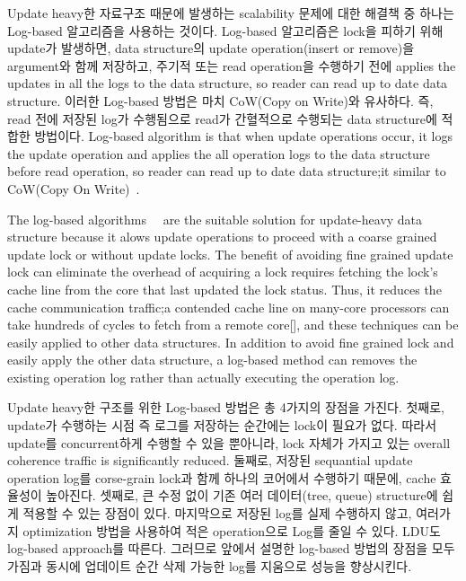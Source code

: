 \ifkor
Update heavy한 자료구조 때문에 발생하는 scalability 문제에 대한 해결책 중 하나는 Log-based 알고리즘을 사용하는
것이다.
Log-based 알고리즘은 lock을 피하기 위해 update가 발생하면, data structure의 update
operation(insert or remove)을 argument와 함께 저장하고, 주기적 또는 read operation을 수행하기 전에
applies the updates in all the logs to the data structure, so reader can read up to date data structure.
이러한 Log-based 방법은 마치 CoW(Copy on Write)와 유사하다.
즉, read 전에 저장된 log가 수행됨으로 read가 간혈적으로 수행되는 data structure에 적합한 방법이다.
\else
Log-based algorithm is that when update operations occur, it logs the update
operation and applies the all operation logs to the data structure
before read operation, so reader can read up to date data structure;it similar
to CoW(Copy On Write)~\cite{PaulDetailLWN}.

The log-based algorithms~\cite{Hendler2010FC}~\cite{SilasBoydWickizerPth} are
the suitable solution for update-heavy data structure because it alows update
operations to proceed with a coarse grained update lock or without update locks.
The benefit of avoiding fine grained update lock can eliminate the overhead of
acquiring a lock requires fetching the lock's cache line from the core that
last updated the lock status.
Thus, it reduces the cache communication traffic;a contended cache line on
many-core processors can take hundreds of cycles to fetch from a remote
core[], and these techniques can be easily applied to other data structures.
In addition to avoid fine grained lock and easily apply the
other data structure, a log-based method can removes the existing
operation log rather than actually executing the operation log.
\fi

%
\ifkor
Update heavy한 구조를 위한 Log-based 방법은 총 4가지의 장점을 가진다. 
첫째로, update가 수행하는 시점 즉 로그를 저장하는 순간에는 lock이 필요가 없다. 
따라서 update를 concurrent하게 수행할 수 있을 뿐아니라, lock 자체가 가지고 있는 overall
coherence traffic is significantly reduced.
둘째로, 저장된 sequantial update operation log를 corse-grain lock과 함께 하나의 코어에서 수행하기
때문에, cache 효율성이 높아진다.
셋째로, 큰 수정 없이 기존 여러 데이터(tree, queue) structure에 쉽게 적용할 수 있는 장점이 있다.
마지막으로 저장된 log를 실제 수행하지 않고, 여러가지 optimization 방법을 사용하여 적은 operation으로 Log를 줄일 수
있다. 
LDU도 log-based approach를 따른다. 그러므로 앞에서 설명한 log-based 방법의 장점을 모두 가짐과 동시에
업데이트 순간 삭제 가능한 log를 지움으로 성능을 향상시킨다.
\else
\fi


